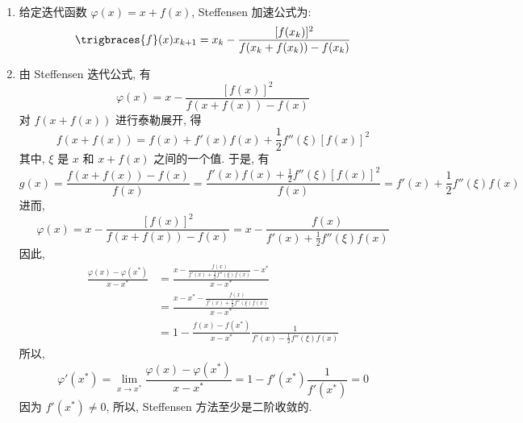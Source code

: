 \documentclass[lang = zh]{iwork}
\begin{document}
\begin{sol} ~
  \begin{enumerate}
    \item 给定迭代函数 $\varphi(x) = x + f(x)$, Steffensen 加速公式为:
          \begin{equation*}
            \trigbraces{f}(x)
            x_{k+1} = x_k - \frac{[f(x_k)]^2}{f(x_k + f(x_k)) - f(x_k)}
          \end{equation*}
    \item 由 Steffensen 迭代公式, 有
          \begin{equation*}
            \varphi(x) = x - \frac{[f(x)]^2}{f(x + f(x)) - f(x)}
          \end{equation*}
          对 $f(x + f(x))$ 进行泰勒展开, 得
          \begin{equation*}
            f(x + f(x)) = f(x) + f'(x) f(x) + \frac{1}{2} f''(\xi) [f(x)]^2
          \end{equation*}
          其中, $\xi$ 是 $x$ 和 $x + f(x)$ 之间的一个值.
          于是, 有
          \begin{equation*}
            g(x)
            = \frac{f(x + f(x)) - f(x)}{f(x)}
            = \frac{f'(x) f(x) + \frac{1}{2} f''(\xi) [f(x)]^2}{f(x)}
            = f'(x) + \frac{1}{2} f''(\xi) f(x)
          \end{equation*}
          进而,
          \begin{equation*}
            \varphi(x)
            = x - \frac{[f(x)]^2}{f(x + f(x)) - f(x)}
            = x - \frac{f(x)}{f'(x) + \frac{1}{2} f''(\xi) f(x)}
          \end{equation*}
          因此,
          \begin{equation*}
            \begin{split}
              \frac{\varphi(x) - \varphi(x^*)}{x - x^*}
               & = \frac{x - \frac{f(x)}{f'(x) + \frac{1}{2} f''(\xi) f(x)} - x^*}{x - x^*}      \\
               & = \frac{x - x^* - \frac{f(x)}{f'(x) + \frac{1}{2} f''(\xi) f(x)}}{x - x^*}      \\
               & = 1 - \frac{f(x) - f(x^*)}{x - x^*} \frac{1}{f'(x) - \frac{1}{2} f''(\xi) f(x)}
            \end{split}
          \end{equation*}
          所以,
          \begin{equation*}
            \varphi'(x^*)
            = \lim_{x \to x^*} \frac{\varphi(x) - \varphi(x^*)}{x - x^*}
            = 1 - f'(x^*) \frac{1}{f'(x^*)}
            = 0
          \end{equation*}
          因为 $f'(x^*) \neq 0$, 所以, Steffensen 方法至少是二阶收敛的.
  \end{enumerate}
\end{sol}
\end{document}

